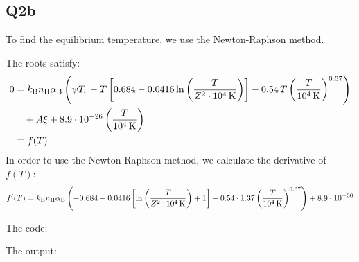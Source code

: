 \subsection{Q2b}

To find the equilibrium temperature, we use the Newton-Raphson method.

The roots satisfy:
\begin{align}
    0 & = k_{\rm B} n_{\rm H} \alpha_{\rm B}
    \left(
        \psi T_{\rm c} - T\left[0.684 - 0.0416 \ln\left(\frac{T}{Z^2 \cdot 10^4 \rm \, K}\right) \right]
        - 0.54 \, T \left(\frac{T}{10^{4} \rm \, K}\right)^{0.37}
    \right) \\
        & \quad + A \xi 
        + 8.9\cdot10^{-26} \left(\frac{T}{10^{4} \rm \, K}\right) \\
        & \equiv f(T)
\end{align}
In order to use the Newton-Raphson method, we calculate the derivative of $f(T)$:
\begin{equation}
    f'(T) = k_{\rm B} n_{\rm H} \alpha_{\rm B}
    \left(
    -0.684
    + 0.0416 \left[\ln\left(\frac{T}{Z^2 \cdot 10^4 \rm \, K}\right) + 1\right]
    - 0.54 \cdot 1.37 \left(\frac{T}{10^{4} \rm \, K}\right)^{0.37}
    \right)
    + 8.9 \cdot 10^{-30}
\end{equation}

\noindent The code:



\noindent The output:


